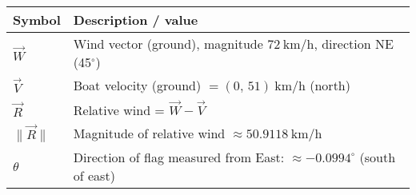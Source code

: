 
\centering
\begin{tabular}{@{}ll@{}}
\toprule
Symbol & Description / value \\ \midrule
$\vec{W}$ & Wind vector (ground), magnitude $72\ \mathrm{km/h}$, direction NE (45$^\circ$) \\
$\vec{V}$ & Boat velocity (ground) $= (0,\,51)\ \mathrm{km/h}$ (north) \\
$\vec{R}$ & Relative wind = $\vec{W}-\vec{V}$ \\
$\|\vec{R}\|$ & Magnitude of relative wind $\approx 50.9118\ \mathrm{km/h}$ \\
$\theta$ & Direction of flag measured from East: $\approx -0.0994^\circ$ (south of east) \\ \bottomrule
\end{tabular}
